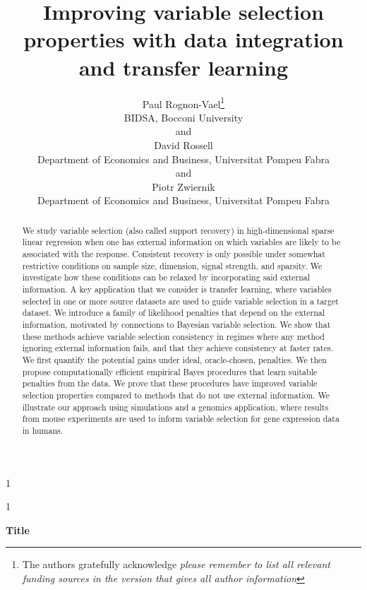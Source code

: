 \documentclass[
  12pt]{article}
\newcommand{\anon}{1}
\begin{document}
\def\spacingset#1{\renewcommand{\baselinestretch}%
{#1}\small\normalsize} \spacingset{1}




\anon
{
  \title{\bf Improving variable selection properties with data integration and transfer learning}
  \author{Paul Rognon-Vael\thanks{
    The authors gratefully acknowledge \textit{please remember to list all relevant funding sources in the version that gives all author information}}\hspace{.2cm}\\
    BIDSA, Bocconi University\\
    and \\
    David Rossell \\
    Department of Economics and Business, Universitat Pompeu Fabra \\
    and \\
    Piotr Zwiernik \\
    Department of Economics and Business, Universitat Pompeu Fabra}
  \maketitle
} \fi

\anon
{
  \bigskip
  \bigskip
  \bigskip
  \begin{center}
    {\LARGE\bf Title}
\end{center}
  \medskip
} \fi

\bigskip
\begin{abstract}
We study variable selection (also called support recovery) in high-dimensional sparse linear regression when one has external information on which variables are likely to be associated with the response.
Consistent recovery is only possible under somewhat restrictive conditions on sample size, dimension, signal strength, and sparsity.
We investigate how these conditions can be relaxed by incorporating said external information. A key application that we consider is transfer learning, where variables selected in one or more source datasets are used to guide variable selection in a target dataset.
We introduce a family of likelihood penalties that depend on the external information, motivated by connections to Bayesian variable selection. We show that these methods achieve variable selection consistency in regimes where any method ignoring external information fails, and that they achieve consistency at faster rates. We first quantify the potential gains under ideal, oracle-chosen, penalties. We then propose computationally efficient empirical Bayes procedures that learn suitable penalties from the data. We prove that these procedures have improved variable selection properties compared to methods that do not use external information. We illustrate our approach using simulations and a genomics application, where results from mouse experiments are used to inform variable selection for gene expression data in humans.
\end{abstract}
\end{document}
